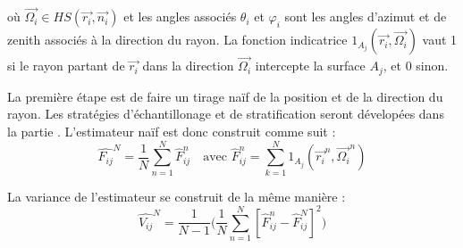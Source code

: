 où $\vec{\Omega_i} \in HS(\vec{r_i}, \vec{n_i})$ et les angles associés $\theta_i$ et $\varphi_i$ sont les angles d'azimut et de zenith associés à la direction du rayon. La fonction indicatrice $1_{A_j}(\vec{r_i}, \vec{\Omega_i})$ vaut 1 si le rayon partant de $\vec{r_i}$ dans la direction $\vec{\Omega_i}$ intercepte la surface $A_j$, et 0 sinon.

La première étape est de faire un tirage naïf de la position et de la direction du rayon. Les stratégies d'échantillonage et de stratification seront dévelopées dans la partie . L'estimateur naïf est donc construit comme suit :
\begin{equation}
    \hat{F_{ij}}^N =   \frac{1}{N} \sum_{n = 1}^{N} \hat{F}_{ij}^{n} \quad \text{avec } \hat{F}_{ij}^{n} = \sum_{k = 1}^{N} 1_{A_j}(\vec{r_i}^{n}, \vec{\Omega_i}^{n}) 
\end{equation}

La variance de l'estimateur se construit de la même manière : 
\begin{equation}
    \hat{V_{ij}}^N =   \frac{1}{N-1} \Big( \frac{1}{N} \sum_{n = 1}^{N}   [ \hat{F}_{ij}^{n} - \hat{F}_{ij}^N]^2    \Big)
\end{equation}
